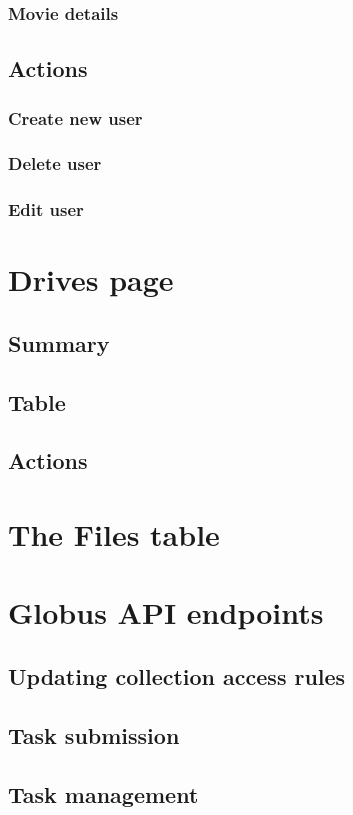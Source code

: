 \documentclass{report}
\begin{document}
\subsection{Movie details}
\section{Actions}
\subsection{Create new user}
\subsection{Delete user}
\subsection{Edit user}

\chapter{Drives page}
\section{Summary}
\section{Table}
\section{Actions}

\appendix

\chapter{The Files table}

\chapter{Globus API endpoints}
\section{Updating collection access rules}
\section{Task submission}
\section{Task management}
\end{document}
